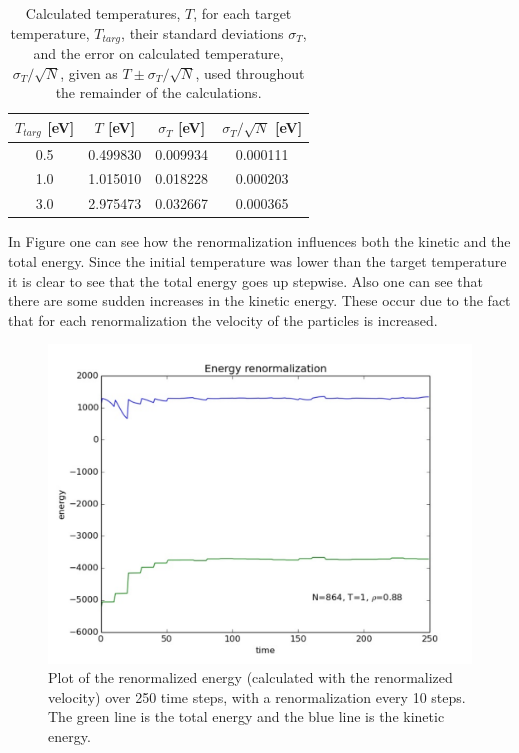 \documentclass{article}
\begin{document}
\begin{multicols}{2}
\begin{table}
\begin{center}
\begin{tabular}{| c | c | c | c |}
\hline $T_{targ}$ [eV] & $T$ [eV] & $\sigma_T$ [eV] & $\sigma_T/\sqrt{N}$ [eV] \\ \hline
 0.5 & 0.499830 & 0.009934 & 0.000111 \\ \hline
1.0 & 1.015010 & 0.018228 & 0.000203  \\ \hline
3.0 & 2.975473 & 0.032667 & 0.000365 \\ \hline
\end{tabular}
\label{temptable}
\caption{Calculated temperatures, $T$, for each target temperature, $T_{targ}$, their standard deviations $\sigma _T$, and the error on calculated temperature, $\sigma _T/\sqrt{N}$, given as $T \pm \sigma_T /\sqrt{N}$, used throughout the remainder of the calculations.}
\end{center}
\end{table}

In Figure \label{engrenbrm} one can see how the renormalization influences both the kinetic and the total energy. Since the initial temperature was lower than the target temperature it is clear to see that the total energy goes up stepwise. Also one can see that there are some sudden increases in the kinetic energy. These occur due to the fact that for each renormalization the velocity of the particles is increased. 

\begin{figure}[H]
\begin{center}
\includegraphics[width=\linewidth]{plots/renormalizationshorttimerange.pdf}
\caption{Plot of the renormalized energy (calculated with the renormalized velocity) over 250 time steps, with a renormalization every 10 steps.  The green line is the total energy and the blue line is the kinetic energy.}
\label{engrenorm}
\end{center}
\end{figure}


\end{multicols}
\end{document}
